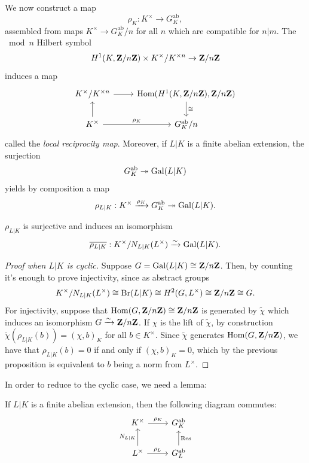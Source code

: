 \documentclass{article}
\begin{document}
We now construct a map
\[
	\rho_K: K^\times \to G_K^\text{ab},
\]
assembled from maps $K^\times\to G_K^\text{ab}/n$ for all $n$ which are compatible for $n|m$. The $\bmod n$ Hilbert symbol
\[
	H^1(K,\mathbf{Z}/n\mathbf{Z})\times K^\times / K^{\times n} \to \mathbf{Z}/n\mathbf{Z}
\]
induces a map
\[
\begin{tikzcd}
K^\times / K^{\times n} \arrow[r] & \Hom(H^1(K,\Z/n\Z),\Z/n\Z)\arrow[d, "\cong"] \\
K^\times \arrow[u] \arrow[r, "\rho_K"] & G_K^\text{ab}/n 
\end{tikzcd}
\]
called the \emph{local reciprocity map}. 
Moreover, if $L|K$ is a finite abelian extension, the surjection 
\[
	G_K^\text{ab}\twoheadrightarrow \operatorname{Gal}(L|K)
\]
yields by composition a map
\[
	\rho_{L|K}: K^\times \xrightarrow{\rho_K} G_K^\text{ab} \twoheadrightarrow \operatorname{Gal}(L|K).
\]
\begin{thm}
		$\rho_{L|K}$ is surjective and induces an isomorphism
		\[
			\overline{\rho_{L|K}}: K^\times / N_{L|K}(L^\times) \xrightarrow{\sim} \operatorname{Gal}(L|K).
		\]
\end{thm}
\begin{proof}[Proof when $L|K$ is cyclic]

		Suppose $G=\operatorname{Gal}(L|K)\cong \mathbf{Z}/n\mathbf{Z}$. Then, by counting it's enough to prove injectivity, since as abstract groups
		\[
			K^\times / N_{L|K}(L^\times) \cong \text{Br}(L|K) \cong H^2(G,L^\times) \cong \mathbf{Z}/n\mathbf{Z} \cong G.
		\]
		For injectivity, suppose that $\operatorname{Hom}(G,\mathbf{Z}/n\mathbf{Z})\cong \mathbf{Z}/n\mathbf{Z}$ is generated by $\widetilde{\chi}$ which induces an isomorphism $G\xrightarrow{\sim} \mathbf{Z}/n\mathbf{Z}$. If $\chi$ is the lift of $\widetilde{\chi}$, by construction $\widetilde{\chi}(\rho_{L|K}(b))=(\chi,b)_K$ for all $b\in K^\times$. Since $\widetilde{\chi}$ generates $\operatorname{Hom}(G,\mathbf{Z}/n\mathbf{Z})$, we have that $\rho_{L|K}(b)=0$ if and only if $(\chi,b)_K=0$, which by the previous proposition is equivalent to $b$ being a norm from $L^\times$.
\end{proof}
In order to reduce to the cyclic case, we need a lemma:
\begin{lem}
		If $L|K$ is a finite abelian extension, then the following diagram commutes:
		\[
			\begin{tikzcd}
					K^\times \arrow[r, "\rho_K"] & G_K^\text{ab} \\
					L^\times \arrow[u, "N_{L|K}"] \arrow[r, "\rho_L"] & G_L^\text{ab} \arrow[u, "\operatorname{Res}"']
			\end{tikzcd}
		\]
\end{lem}
\end{document}
